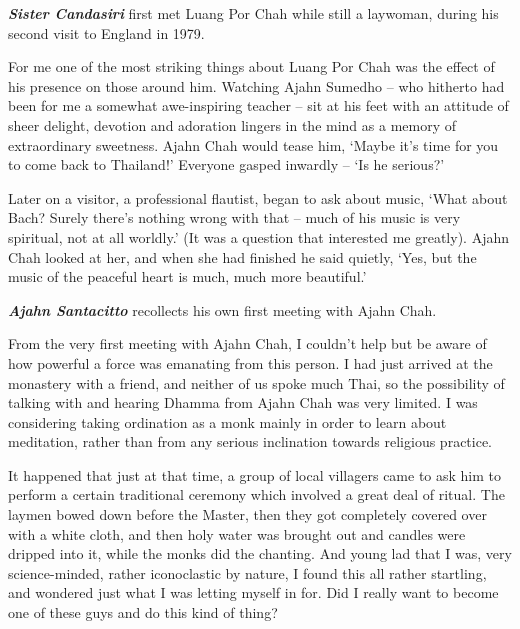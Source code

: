 \textbf{\emph{Sister Candasiri}} first met Luang Por Chah while still a
laywoman, during his second visit to England in 1979. 

For me one of the most striking things about Luang Por Chah was the
effect of his presence on those around him. Watching Ajahn Sumedho --
who hitherto had been for me a somewhat awe-inspiring teacher -- sit at
his feet with an attitude of sheer delight, devotion and adoration
lingers in the mind as a memory of extraordinary sweetness. Ajahn Chah
would tease him, `Maybe it's time for you to come back to Thailand!'
Everyone gasped inwardly -- `Is he serious?'

Later on a visitor, a professional flautist, began to ask about music, 
`What about Bach? Surely there's nothing wrong with that -- much of his
music is very spiritual, not at all worldly.' (It was a question that
interested me greatly). Ajahn Chah looked at her, and when she had
finished he said quietly, `Yes, but the music of the peaceful heart is
much, much more beautiful.'

\textbf{\emph{Ajahn Santacitto}} recollects his own first meeting with
Ajahn Chah. 

From the very first meeting with Ajahn Chah, I couldn't help but be
aware of how powerful a force was emanating from this person. I had just
arrived at the monastery with a friend, and neither of us spoke much
Thai, so the possibility of talking with and hearing Dhamma from Ajahn
Chah was very limited. I was considering taking ordination as a monk
mainly in order to learn about meditation, rather than from any serious
inclination towards religious practice. 

It happened that just at that time, a group of local villagers came to
ask him to perform a certain traditional ceremony which involved a great
deal of ritual. The laymen bowed down before the Master, then they got
completely covered over with a white cloth, and then holy water was
brought out and candles were dripped into it, while the monks did the
chanting. And young lad that I was, very science-minded, rather
iconoclastic by nature, I found this all rather startling, and wondered
just what I was letting myself in for. Did I really want to become one
of these guys and do this kind of thing? 

